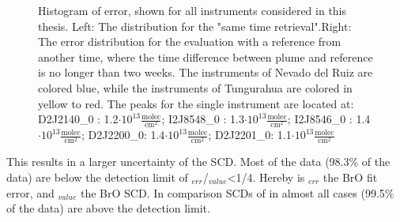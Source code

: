\begin{figure}[h!]
    \caption[Histogram of  error, shown for all instruments considered in this thesis.]{Histogram of  error, shown for all instruments considered in this thesis. Left: The  distribution for the "same time retrieval".Right: The  error distribution for the evaluation with a reference from another time, where the time difference between plume and reference is no longer than two weeks. The instruments of Nevado del Ruiz are colored blue, while the instruments of Tungurahua are colored in yellow to red.
        The peaks for the single instrument are located at: D2J2140\_0 : 1.2$\cdot 10^{13}\frac{\text{molec}}{\text{cm}^2}$; I2J8548\_0 : 1.3$\cdot 10^{13}\frac{\text{molec}}{\text{cm}^2}$;
        I2J8546\_0 : 1.4$\cdot 10^{13}\frac{\text{molec}}{\text{cm}^2}$;
        D2J2200\_0: 1.4$\cdot 10^{13}\frac{\text{molec}}{\text{cm}^2}$;
        D2J2201\_0: 1.1$\cdot 10^{13}\frac{\text{molec}}{\text{cm}^2}$}
    \label{fig:allbroerrordistribution}
\end{figure}
%
This results in a larger uncertainty of the   SCD. Most of the  data (98.3\% of the data) are below the detection limit of $_{err}$/$_{value}$<1/4. Hereby is $_{err}$ the BrO fit error, and $_{value}$ the BrO SCD. In comparison SCDs of  in almost all cases (99.5\% of the data)  are above the detection limit. \\
